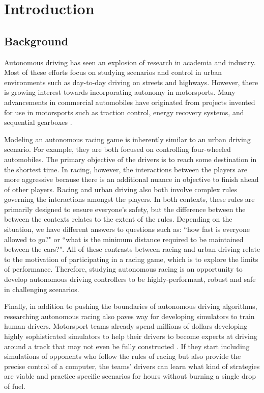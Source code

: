 \chapter{Introduction} \label{chapter:intro}
\section{Background} 
Autonomous driving has seen an explosion of research in academia and industry. Most of these efforts focus on studying scenarios and control in urban environments such as day-to-day driving on streets and highways. However, there is growing interest towards incorporating autonomy in motorsports. Many advancements in commercial automobiles have originated from projects invented for use in motorsports such as traction control, energy recovery systems, and sequential gearboxes \cite{racingadvances}. 

Modeling an autonomous racing game is inherently similar to an urban driving scenario. For example, they are both focused on controlling four-wheeled automobiles. The primary objective of the drivers is to reach some destination in the shortest time. In racing, however, the interactions between the players are more aggressive because there is an additional nuance in objective to finish ahead of other players. Racing and urban driving also both involve complex rules governing the interactions amongst the players. In both contexts, these rules are primarily designed to ensure everyone's safety, but the difference between the between the contexts relates to the extent of the rules. Depending on the situation, we have different answers to questions such as: ``how fast is everyone allowed to go?" or ``what is the minimum distance required to be maintained between the cars?". All of these contrasts between racing and urban driving relate to the motivation of participating in a racing game, which is to explore the limits of performance. Therefore, studying autonomous racing is an opportunity to develop autonomous driving controllers to be highly-performant, robust and safe in challenging scenarios. 

Finally, in addition to pushing the boundaries of autonomous driving algorithms, researching autonomous racing also paves way for developing simulators to train human drivers. Motorsport teams already spend millions of dollars developing highly sophisticated simulators to help their drivers to become experts at driving around a track that may not even be fully constructed \cite{simulators}. If they start including simulations of opponents who follow the rules of racing but also provide the precise control of a computer, the teams' drivers can learn what kind of strategies are viable and practice specific scenarios for hours without burning a single drop of fuel.

